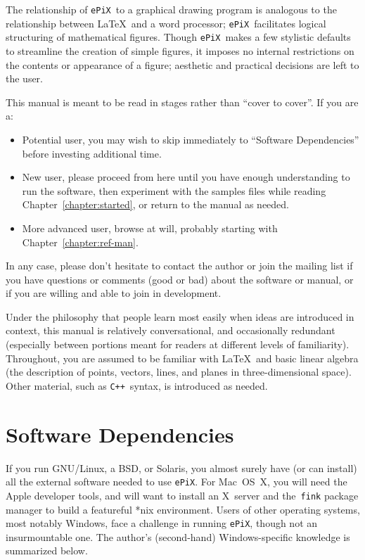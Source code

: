\documentclass[12pt]{report}
\newcommand{\code}[1]{\texttt{#1}}
\newcommand{\ePiX}{\code{ePiX}}
\newcommand{\CXX}{\code{C++}}
\newcommand{\bi}{\begin{itemize}}
\newcommand{\ei}{\end{itemize}}
\begin{document}
The relationship of \ePiX\ to a graphical drawing program is analogous
to the relationship between \LaTeX\ and a word processor; \ePiX\ 
facilitates logical structuring of mathematical figures. Though \ePiX\ 
makes a few stylistic defaults to streamline the creation of simple
figures, it imposes no internal restrictions on the contents or
appearance of a figure; aesthetic and practical decisions are left to
the user.

This manual is meant to be read in stages rather than ``cover to
cover''. If you are a:

\bi

\item Potential user, you may wish to skip immediately to ``Software
Dependencies'' before investing additional time.

\item New user, please proceed from here until you have enough
  understanding to run the software, then experiment with the samples
  files while reading Chapter~\ref{chapter:started}, or return to the
  manual as needed.

\item More advanced user, browse at will, probably starting with
  Chapter~\ref{chapter:ref-man}.

\ei

In any case, please don't hesitate to contact the author or join the
mailing list if you have questions or comments (good or bad) about the
software or manual, or if you are willing and able to join in
development.

Under the philosophy that people learn most easily when ideas are
introduced in context, this manual is relatively conversational, and
occasionally redundant (especially between portions meant for readers
at different levels of familiarity). Throughout, you are assumed to be
familiar with \LaTeX\ and basic linear algebra (the description of
points, vectors, lines, and planes in three-dimensional space). Other
material, such as \CXX\ syntax, is introduced as needed.


\section{Software Dependencies}

 If you run GNU/Linux, a BSD, or Solaris, you
almost surely have (or can install) all the external software needed
to use \ePiX.  For Mac~OS~X,\index{Mac OS X} you will need the Apple
developer tools, and will want to install an X~server and
the~\code{fink} package manager to build a featureful *nix
environment.  Users of other operating systems, most notably Windows,
face a challenge in running \ePiX, though not an insurmountable one.
The author's (second-hand) Windows-specific knowledge is summarized
below.
\end{document}
